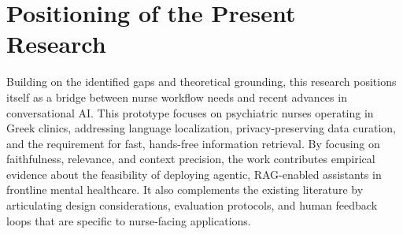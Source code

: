 \section{Positioning of the Present Research}
Building on the identified gaps and theoretical grounding, this research positions itself as a bridge between nurse workflow needs and recent advances in conversational AI. This prototype focuses on psychiatric nurses operating in Greek clinics, addressing language localization, privacy-preserving data curation, and the requirement for fast, hands-free information retrieval. By focusing on faithfulness, relevance, and context precision, the work contributes empirical evidence about the feasibility of deploying agentic, RAG-enabled assistants in frontline mental healthcare. It also complements the existing literature by articulating design considerations, evaluation protocols, and human feedback loops that are specific to nurse-facing applications.


